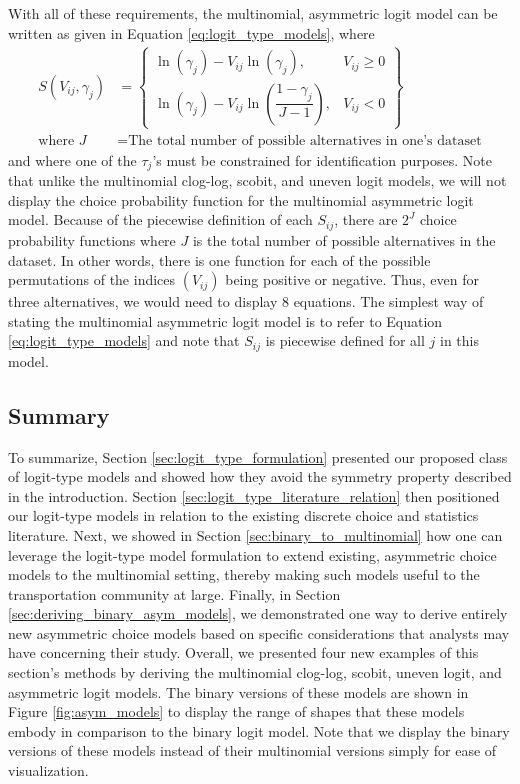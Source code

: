 With all of these requirements, the multinomial, asymmetric logit model can be written as given in Equation \ref{eq:logit_type_models}, where
\begin{equation}
\begin{aligned}
S \left( V_{ij}, \gamma _j \right) &= \left\lbrace \begin{array}{cc}
 \ln \left( \gamma _j \right) - V_{ij} \ln \left( \gamma_j \right), & V_{ij} \geq 0
 \\[2ex]
 \ln \left( \gamma _j \right) - V_{ij} \ln \left( \dfrac{1 - \gamma_j}{J - 1} \right), & V_{ij} < 0
\end{array} \right\rbrace \\
\textrm{where } J &= \textrm{The total number of possible alternatives in one's dataset}
\end{aligned}
\end{equation}
and where one of the $\tau_j$'s must be constrained for identification purposes. Note that unlike the multinomial clog-log, scobit, and uneven logit models, we will not display the choice probability function for the multinomial asymmetric logit model. Because of the piecewise definition of each $S_{ij}$, there are $2^J$ choice probability functions where $J$ is the total number of possible alternatives in the dataset. In other words, there is one function for each of the possible permutations of the indices $\left( V_{ij} \right)$ being positive or negative. Thus, even for three alternatives, we would need to display 8 equations. The simplest way of stating the multinomial asymmetric logit model is to refer to Equation \ref{eq:logit_type_models} and note that $S_{ij}$ is piecewise defined for all $j$ in this model.

\subsection{Summary}
\label{sec:logit_type_summary}
To summarize, Section \ref{sec:logit_type_formulation} presented our proposed class of logit-type models and showed how they avoid the symmetry property described in the introduction. Section \ref{sec:logit_type_literature_relation} then positioned our logit-type models in relation to the existing discrete choice and statistics literature. Next, we showed in Section \ref{sec:binary_to_multinomial} how one can leverage the logit-type model formulation to extend existing, asymmetric choice models to the multinomial setting, thereby making such models useful to the transportation community at large. Finally, in Section \ref{sec:deriving_binary_asym_models}, we demonstrated one way to derive entirely new asymmetric choice models based on specific considerations that analysts may have concerning their study. Overall, we presented four new examples of this section's methods by deriving the multinomial clog-log, scobit, uneven logit, and asymmetric logit models. The binary versions of these models are shown in Figure \ref{fig:asym_models} to display the range of shapes that these models embody in comparison to the binary logit model. Note that we display the binary versions of these models instead of their multinomial versions simply for ease of visualization.


